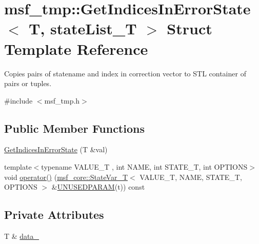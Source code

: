 \hypertarget{structmsf__tmp_1_1GetIndicesInErrorState}{\section{msf\-\_\-tmp\-:\-:Get\-Indices\-In\-Error\-State$<$ T, state\-List\-\_\-\-T $>$ Struct Template Reference}
\label{structmsf__tmp_1_1GetIndicesInErrorState}
}


Copies pairs of statename and index in correction vector to S\-T\-L container of pairs or tuples.  




{\ttfamily \#include $<$msf\-\_\-tmp.\-h$>$}

\subsection*{Public Member Functions}
\begin{DoxyCompactItemize}
\item 
\hyperlink{structmsf__tmp_1_1GetIndicesInErrorState_ac6acac49c18bc83f47687022c90e09c4}{Get\-Indices\-In\-Error\-State} (T \&val)
\item 
{\footnotesize template$<$typename V\-A\-L\-U\-E\-\_\-\-T , int N\-A\-M\-E, int S\-T\-A\-T\-E\-\_\-\-T, int O\-P\-T\-I\-O\-N\-S$>$ }\\void \hyperlink{structmsf__tmp_1_1GetIndicesInErrorState_a930484a708220e0bf2ecf4f415c96e02}{operator()} (\hyperlink{structmsf__core_1_1StateVar__T}{msf\-\_\-core\-::\-State\-Var\-\_\-\-T}$<$ V\-A\-L\-U\-E\-\_\-\-T, N\-A\-M\-E, S\-T\-A\-T\-E\-\_\-\-T, O\-P\-T\-I\-O\-N\-S $>$ \&\hyperlink{msf__macros_8h_a2d2af1048de7b1510994ffd3bc32aacc}{U\-N\-U\-S\-E\-D\-P\-A\-R\-A\-M}(t)) const 
\end{DoxyCompactItemize}
\subsection*{Private Attributes}
\begin{DoxyCompactItemize}
\item 
T \& \hyperlink{structmsf__tmp_1_1GetIndicesInErrorState_ab3b331c86e7dcf3ad2cad273efbe8743}{data\-\_\-}
\end{DoxyCompactItemize}


